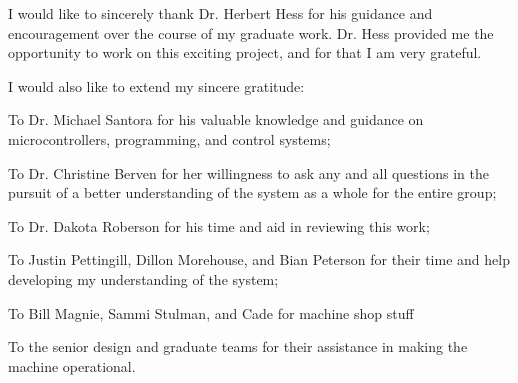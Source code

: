 \onehalfspacing
I would like to sincerely thank Dr. Herbert Hess for his guidance and encouragement over the course of my graduate work. Dr. Hess provided me the opportunity to work on this exciting project, and for that I am very grateful. 

\noindent I would also like to extend my sincere gratitude:

To Dr. Michael Santora for his valuable knowledge and guidance on microcontrollers, programming, and control systems;

To Dr. Christine Berven for her willingness to ask any and all questions in the pursuit of a better understanding of the system as a whole for the entire group;

To Dr. Dakota Roberson for his time and aid in reviewing this work;

To Justin Pettingill, Dillon Morehouse, and Bian Peterson for their time and help developing my understanding of the system;

To Bill Magnie, Sammi Stulman, and Cade for machine shop stuff %

To the senior design and graduate teams for their assistance in making the machine operational.

